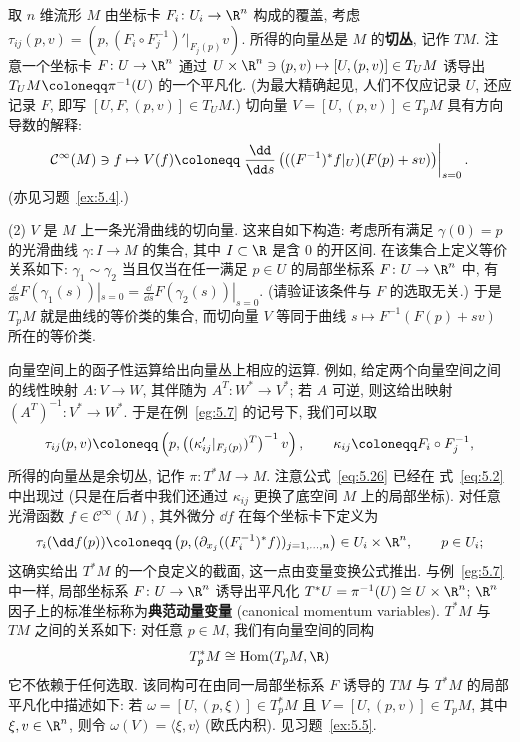 \begin{example}[切丛与余切丛]\label{eg:5.7}
取 $n$ 维流形 $M$ 由坐标卡 $F_i \colon U_i \to \R^n$ 构成的覆盖, 考虑 $\tau_{ij}(p, v) = (p, (F_i \circ F_j^{-1})'|_{F_j(p)} v)$. 所得的向量丛是 $M$ 的\textbf{切丛}, 记作 $TM$. 注意一个坐标卡 $F \colon U \to \R^n$ 通过 $U \times \R^n \ni (p, v) \mapsto [U, (p, v)] \in T_U M$ 诱导出 $T_U M \defeq \pi^{-1}(U)$ 的一个平凡化. (为最大精确起见, 人们不仅应记录 $U$, 还应记录 $F$, 即写 $[U, F, (p, v)] \in T_U M$.) 切向量 $V = [U, (p, v)] \in T_p M$ 具有方向导数的解释:
\begin{equation}\label{eq:5.25}
    \mathcal{C}^\infty(M) \ni f \mapsto V(f) \defeq \left. \frac{\dd}{\dd s} \left( ((F^{-1})^* f|_U)(F(p) + s v) \right) \right|_{s = 0}.
\end{equation}
(亦见习题~\ref{ex:5.4}.)

(2) $V$ 是 $M$ 上一条光滑曲线的切向量. 这来自如下构造: 考虑所有满足 $\gamma(0) = p$ 的光滑曲线 $\gamma \colon I \to M$ 的集合, 其中 $I \subset \R$ 是含 0 的开区间. 在该集合上定义等价关系如下: $\gamma_1 \sim \gamma_2$ 当且仅当在任一满足 $p \in U$ 的局部坐标系 $F \colon U \to \R^n$ 中, 有 $\frac{\dd}{\dd s} F(\gamma_1(s))|_{s = 0} = \frac{\dd}{\dd s} F(\gamma_2(s))|_{s = 0}$. (请验证该条件与 $F$ 的选取无关.) 于是 $T_p M$ 就是曲线的等价类的集合, 而切向量 $V$ 等同于曲线 $s \mapsto F^{-1}(F(p) + s v)$ 所在的等价类.

向量空间上的函子性运算给出向量丛上相应的运算. 例如, 给定两个向量空间之间的线性映射 $A \colon V \to W$, 其伴随为 $A^T \colon W^* \to V^*$; 若 $A$ 可逆, 则这给出映射 $(A^T)^{-1} \colon V^* \to W^*$. 于是在例~\ref{eg:5.7} 的记号下, 我们可以取
\begin{equation}\label{eq:5.26}
    \tau_{ij}(p, v) \defeq \left( p, \left( (\kappa_{ij}'|_{F_j(p)})^T \right)^{-1} v \right), \qquad \kappa_{ij} \defeq F_i \circ F_j^{-1},
\end{equation}
所得的向量丛是余切丛, 记作 $\pi \colon T^* M \to M$. 注意公式~\eqref{eq:5.26} 已经在 式~\eqref{eq:5.2} 中出现过 (只是在后者中我们还通过 $\kappa_{ij}$ 更换了底空间 $M$ 上的局部坐标). 对任意光滑函数 $f \in \mathcal{C}^\infty(M)$, 其外微分 $\dd f$ 在每个坐标卡下定义为
\begin{equation}\label{eq:5.27}
    \tau_i(\dd f(p)) \defeq \left( p, (\partial_{x_j}((F_i^{-1})^* f))_{j=1, \ldots, n} \right) \in U_i \times \R^n, \qquad p \in U_i;
\end{equation}
这确实给出 $T^* M$ 的一个良定义的截面, 这一点由变量变换公式推出. 与例~\ref{eg:5.7} 中一样, 局部坐标系 $F \colon U \to \R^n$ 诱导出平凡化 $T^* U = \pi^{-1}(U) \cong U \times \R^n$; $\R^n$ 因子上的标准坐标称为\textbf{典范动量变量} (canonical momentum variables). $T^* M$ 与 $TM$ 之间的关系如下: 对任意 $p \in M$, 我们有向量空间的同构
\begin{equation}\label{eq:5.28}
    T_p^* M \cong \operatorname{Hom}(T_p M, \R)
\end{equation}
它不依赖于任何选取. 该同构可在由同一局部坐标系 $F$ 诱导的 $TM$ 与 $T^* M$ 的局部平凡化中描述如下: 若 $\omega = [U, (p, \xi)] \in T_p^* M$ 且 $V = [U, (p, v)] \in T_p M$, 其中 $\xi, v \in \R^n$, 则令 $\omega(V) = \langle \xi, v \rangle$ (欧氏内积). 见习题~\ref{ex:5.5}.


\end{example}
